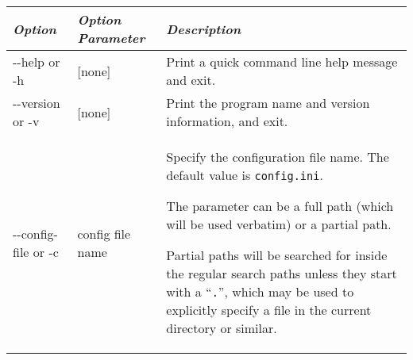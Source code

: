 \begin{longtabu} to \textwidth {l|l|X}
\toprule
\emph{Option} & \emph{Option Parameter} & \emph{Description}\tabularnewline
\midrule
-\/-help or -h & {[}none{]} & Print a quick command line help message and exit. \tabularnewline
\midrule
-\/-version or -v & {[}none{]} & Print the program name and version information, and exit. \tabularnewline
\midrule
-\/-config-file or -c & config file name & Specify the configuration file name. The default value is \texttt{config.ini}.

The parameter can be a full path (which will be used verbatim) or a partial path.

Partial paths will be searched for inside the regular search paths
unless they start with a ``\texttt{.}'', which may be used to explicitly
specify a file in the current directory or similar.


\end{longtabu}
